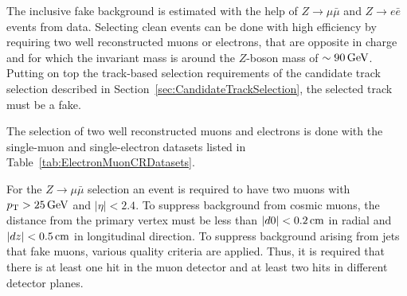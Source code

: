The inclusive fake background is estimated with the help of $Z\rightarrow\mu\bar{\mu}$ and $Z\rightarrow e\bar{e}$ events from data.
Selecting clean \Zlep events can be done with high efficiency by requiring two well reconstructed muons or electrons, that are opposite in charge and for which the invariant mass is around the $Z$-boson mass of $\sim90\,\text{Ge}\kern-0.06667em\text{V}$.
Putting on top the track-based selection requirements of the candidate track selection described in Section~\ref{sec:CandidateTrackSelection}, the selected track must be a fake.

The selection of two well reconstructed muons and electrons is done with the single-muon and single-electron datasets listed in Table~\ref{tab:ElectronMuonCRDatasets}.
\renewcommand{\arraystretch}{1.5}
\begin{table}[!h]
\centering
\caption{Datasets used for the determination of the fake rate.}
\label{tab:ElectronMuonCRDatasets}
\end{table}  
For the $Z\rightarrow\mu\bar{\mu}$ selection an event is required to have two muons with $p_{\text{T}}>25\,\text{Ge}\kern-0.06667em\text{V}$ and $|\eta|<2.4$.
To suppress background from cosmic muons, the distance from the primary vertex must be less than $|d0|<0.2\,\text{cm}$ in radial and $|dz|<0.5\,\text{cm}$ in longitudinal direction.
To suppress background arising from jets that fake muons, various quality criteria are applied. 
Thus, it is required that there is at least one hit in the muon detector and at least two hits in different detector planes.   
